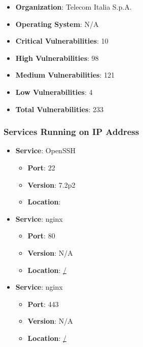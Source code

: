 \documentclass{article}
\begin{document}
\begin{itemize}
    \item \textbf{Organization}: Telecom Italia S.p.A.
    \item \textbf{Operating System}:  N/A 
    \item \textbf{Critical Vulnerabilities}: 10
    \item \textbf{High Vulnerabilities}: 98
    \item \textbf{Medium Vulnerabilities}: 121
    \item \textbf{Low Vulnerabilities}: 4
    \item \textbf{Total Vulnerabilities}: 233
\end{itemize}

\subsubsection*{Services Running on IP Address}

\begin{itemize}
    
        \item \textbf{Service}: OpenSSH
        \begin{itemize}
            \item \textbf{Port}: 22
            \item \textbf{Version}:  7.2p2 
            \item \textbf{Location}: \href{  }{  }
        \end{itemize}
    
        \item \textbf{Service}: nginx
        \begin{itemize}
            \item \textbf{Port}: 80
            \item \textbf{Version}:  N/A 
            \item \textbf{Location}: \href{ / }{ / }
        \end{itemize}
    
        \item \textbf{Service}: nginx
        \begin{itemize}
            \item \textbf{Port}: 443
            \item \textbf{Version}:  N/A 
            \item \textbf{Location}: \href{ / }{ / }
        \end{itemize}
    
\end{itemize}
\end{document}

